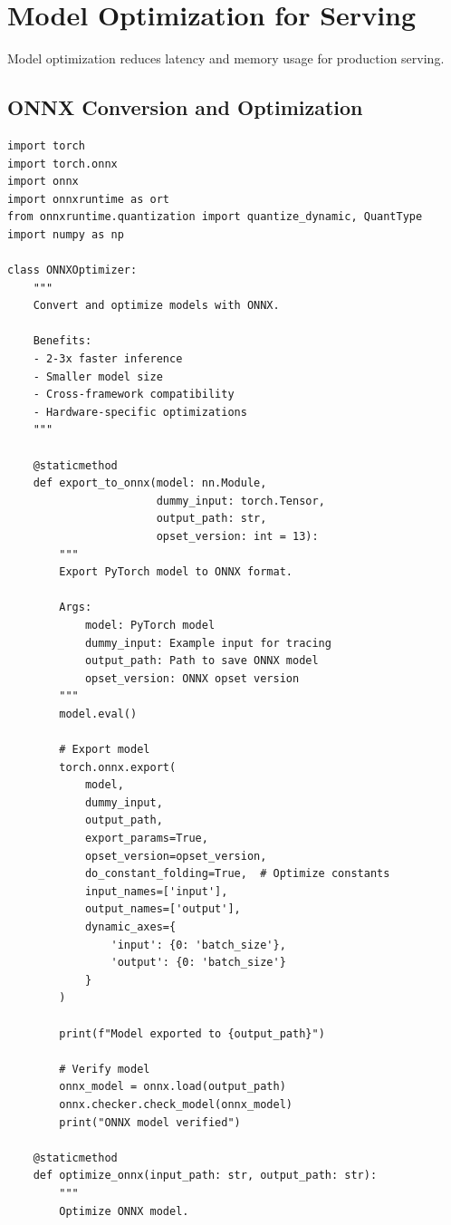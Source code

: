 \section{Model Optimization for Serving}

Model optimization reduces latency and memory usage for production serving.

\subsection{ONNX Conversion and Optimization}

\begin{lstlisting}[style=python, caption=Convert PyTorch model to ONNX]
import torch
import torch.onnx
import onnx
import onnxruntime as ort
from onnxruntime.quantization import quantize_dynamic, QuantType
import numpy as np

class ONNXOptimizer:
    """
    Convert and optimize models with ONNX.

    Benefits:
    - 2-3x faster inference
    - Smaller model size
    - Cross-framework compatibility
    - Hardware-specific optimizations
    """

    @staticmethod
    def export_to_onnx(model: nn.Module,
                       dummy_input: torch.Tensor,
                       output_path: str,
                       opset_version: int = 13):
        """
        Export PyTorch model to ONNX format.

        Args:
            model: PyTorch model
            dummy_input: Example input for tracing
            output_path: Path to save ONNX model
            opset_version: ONNX opset version
        """
        model.eval()

        # Export model
        torch.onnx.export(
            model,
            dummy_input,
            output_path,
            export_params=True,
            opset_version=opset_version,
            do_constant_folding=True,  # Optimize constants
            input_names=['input'],
            output_names=['output'],
            dynamic_axes={
                'input': {0: 'batch_size'},
                'output': {0: 'batch_size'}
            }
        )

        print(f"Model exported to {output_path}")

        # Verify model
        onnx_model = onnx.load(output_path)
        onnx.checker.check_model(onnx_model)
        print("ONNX model verified")

    @staticmethod
    def optimize_onnx(input_path: str, output_path: str):
        """
        Optimize ONNX model.


\end{lstlisting}
